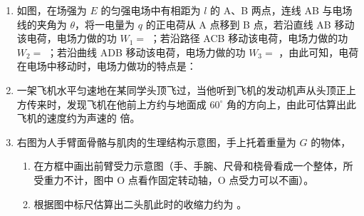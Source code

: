 \documentclass[\gkver]{gaokaozhenti}
\begin{document}
\begin{enumerate}
\item
如图，在场强为 $E$ 的匀强电场中有相距为 $l$ 的 A、B 两点，连线 AB 与电场线的夹角为 $\theta$，将一电量为 $q$ 的正电荷从 A 点移到 B 点，若沿直线 AB 移动该电荷，电场力做的功 $W_{1}=$ ；若沿路径 ACB 移动该电荷，电场力做的功 $W_{2}=$ ；若沿曲线 ADB 移动该电荷，电场力做的功 $W_{3}=$ ，由此可知，电荷在电场中移动时，电场力做功的特点是：

\onepicture[align=right, w=3.77cm]{}



\item
一架飞机水平匀速地在某同学头顶飞过，当他听到飞机的发动机声从头顶正上方传来时，发现飞机在他前上方约与地面成 $60^{\circ}$ 角的方向上，由此可估算出此飞机的速度约为声速的  倍。



\item
右图为人手臂面骨骼与肌肉的生理结构示意图，手上托着重量为 $G$ 的物体，

\begin{enumerate}
\item
在方框中画出前臂受力示意图（手、手腕、尺骨和桡骨看成一个整体，所受重力不计，图中 O 点看作固定转动轴，O 点受力可以不画）。
\item
根据图中标尺估算出二头肌此时的收缩力约为 。
\end{enumerate}


\end{enumerate}
\end{document}
